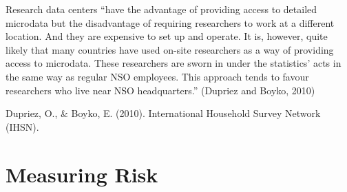 \documentclass[letterpaper,10pt,english]{sphinxmanual}
\begin{document}
Research data centers “have the advantage of providing access to
detailed microdata but the disadvantage of requiring researchers to work
at a different location. And they are expensive to set up and operate.
It is, however, quite likely that many countries have used on-site
researchers as a way of providing access to microdata. These researchers
are sworn in under the statistics’ acts in the same way as regular NSO
employees. This approach tends to favour researchers who live near NSO
headquarters.” (Dupriez and Boyko, 2010)


Dupriez, O., \& Boyko, E. (2010).  International Household Survey
Network (IHSN).


\chapter{Measuring Risk}
\label{\detokenize{measure_risk:measuring-risk}}\label{\detokenize{measure_risk::doc}}
\end{document}
